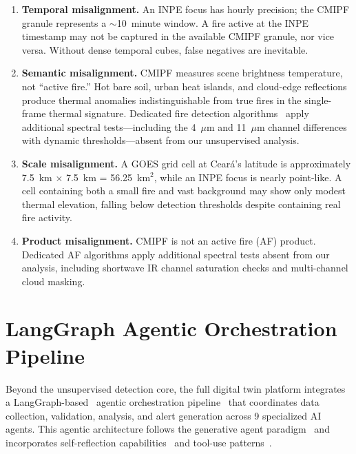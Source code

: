 \documentclass[11pt,twocolumn,a4paper]{article}
\newcommand{\abbrev}[1]{{\small\textsc{#1}}}
\begin{document}
\begin{enumerate}
  \item \textbf{Temporal misalignment.} An \abbrev{INPE} focus has hourly precision; the \abbrev{CMIPF} granule represents a $\sim$10~minute window. A fire active at the \abbrev{INPE} timestamp may not be captured in the available \abbrev{CMIPF} granule, nor vice versa. Without dense temporal cubes, false negatives are inevitable.
  \item \textbf{Semantic misalignment.} \abbrev{CMIPF} measures scene brightness temperature, not ``active fire.'' Hot bare soil, urban heat islands, and cloud-edge reflections produce thermal anomalies indistinguishable from true fires in the single-frame thermal signature. Dedicated fire detection algorithms~\cite{schmidt2021} apply additional spectral tests---including the 4~$\mu$m and 11~$\mu$m channel differences with dynamic thresholds---absent from our unsupervised analysis.
  \item \textbf{Scale misalignment.} A \abbrev{GOES} grid cell at Cear\'{a}'s latitude is approximately 7.5~km $\times$ 7.5~km = 56.25~km$^2$, while an \abbrev{INPE} focus is nearly point-like. A cell containing both a small fire and vast background may show only modest thermal elevation, falling below detection thresholds despite containing real fire activity.
  \item \textbf{Product misalignment.} \abbrev{CMIPF} is not an active fire (\abbrev{AF}) product. Dedicated \abbrev{AF} algorithms apply additional spectral tests absent from our analysis, including shortwave \abbrev{IR} channel saturation checks and multi-channel cloud masking.
\end{enumerate}

\section{LangGraph Agentic Orchestration Pipeline}
\label{sec:langgraph}

Beyond the unsupervised detection core, the full digital twin platform integrates a LangGraph-based~\cite{langchain2025} agentic orchestration pipeline~\cite{xi2023,wang2024_survey,gao2024_rag} that coordinates data collection, validation, analysis, and alert generation across 9 specialized \abbrev{AI} agents. This agentic architecture follows the generative agent paradigm~\cite{park2023} and incorporates self-reflection capabilities~\cite{shinn2023} and tool-use patterns~\cite{schick2023,patil2023}.
\end{document}

